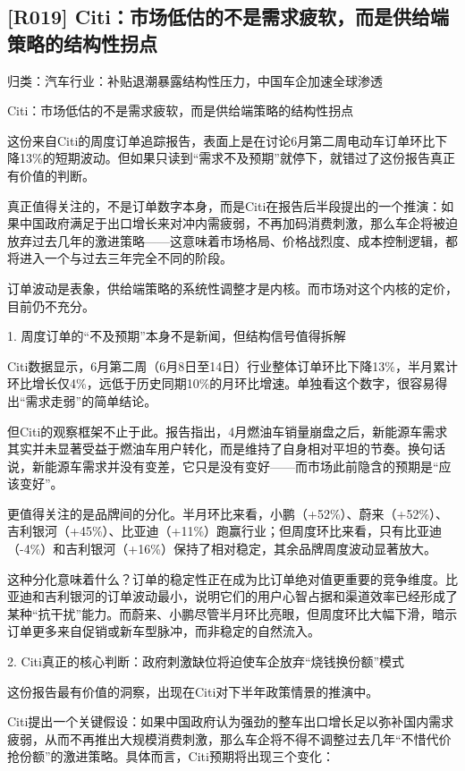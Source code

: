 \documentclass[11pt]{ctexart}
\begin{document}
\subsection{[R019] Citi：市场低估的不是需求疲软，而是供给端策略的结构性拐点}
{\small\color{refgray}归类：汽车行业：补贴退潮暴露结构性压力，中国车企加速全球渗透}

Citi：市场低估的不是需求疲软，而是供给端策略的结构性拐点

这份来自Citi的周度订单追踪报告，表面上是在讨论6月第二周电动车订单环比下降13\%的短期波动。但如果只读到“需求不及预期”就停下，就错过了这份报告真正有价值的判断。

真正值得关注的，不是订单数字本身，而是Citi在报告后半段提出的一个推演：如果中国政府满足于出口增长来对冲内需疲弱，不再加码消费刺激，那么车企将被迫放弃过去几年的激进策略——这意味着市场格局、价格战烈度、成本控制逻辑，都将进入一个与过去三年完全不同的阶段。

订单波动是表象，供给端策略的系统性调整才是内核。而市场对这个内核的定价，目前仍不充分。

1. 周度订单的“不及预期”本身不是新闻，但结构信号值得拆解

Citi数据显示，6月第二周（6月8日至14日）行业整体订单环比下降13\%，半月累计环比增长仅4\%，远低于历史同期10\%的月环比增速。单独看这个数字，很容易得出“需求走弱”的简单结论。

但Citi的观察框架不止于此。报告指出，4月燃油车销量崩盘之后，新能源车需求其实并未显著受益于燃油车用户转化，而是维持了自身相对平坦的节奏。换句话说，新能源车需求并没有变差，它只是没有变好——而市场此前隐含的预期是“应该变好”。

更值得关注的是品牌间的分化。半月环比来看，小鹏（+52\%）、蔚来（+52\%）、吉利银河（+45\%）、比亚迪（+11\%）跑赢行业；但周度环比来看，只有比亚迪（-4\%）和吉利银河（+16\%）保持了相对稳定，其余品牌周度波动显著放大。

这种分化意味着什么？订单的稳定性正在成为比订单绝对值更重要的竞争维度。比亚迪和吉利银河的订单波动最小，说明它们的用户心智占据和渠道效率已经形成了某种“抗干扰”能力。而蔚来、小鹏尽管半月环比亮眼，但周度环比大幅下滑，暗示订单更多来自促销或新车型脉冲，而非稳定的自然流入。

2. Citi真正的核心判断：政府刺激缺位将迫使车企放弃“烧钱换份额”模式

这份报告最有价值的洞察，出现在Citi对下半年政策情景的推演中。

Citi提出一个关键假设：如果中国政府认为强劲的整车出口增长足以弥补国内需求疲弱，从而不再推出大规模消费刺激，那么车企将不得不调整过去几年“不惜代价抢份额”的激进策略。具体而言，Citi预期将出现三个变化：
\end{document}
